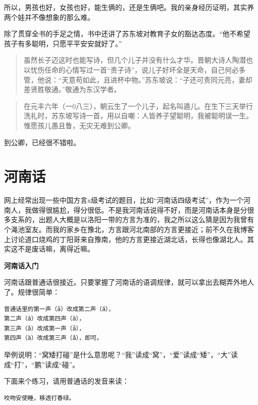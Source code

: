 \documentclass[twoside,openright,headings=optiontohead]{ctexbook} %
\begin{document}
{所以，男孩也好，女孩也好，能生俩的，还是生俩吧。我的亲身经历证明，其实养两个娃并不像想象的那么难。

除了贯穿全书的手足之情，书中还讲了苏东坡对教育子女的豁达态度。``他不希望孩子有多聪明，只愿平平安安就好了。''

\begin{quote}
虽然长子迈这时也能写诗，但几个儿子并没有什么才华。晋朝大诗人陶潜也以忧伤任命的心情写过一首``责子诗''，说儿子好坏全是天命，自己何必多管，他说：``天意苟如此，且进杯中物。''苏东坡说：``子还可责同元亮，妻却差贤胜敬通。''敬通为东汉学者。
\end{quote}

\begin{quote}
在元丰六年（一0八三），朝云生了一个儿子，起名叫遁儿。在生下三天举行洗礼时，苏东坡写诗一首，用以自嘲：人皆养子望聪明，我被聪明误一生。惟愿孩儿愚且鲁，无灾无难到公卿。
\end{quote}

到公卿，已经很不错啦。

\chapter*{河南话}\label{henanese}

网上经常出现一些中国方言x级考试的题目，比如``河南话四级考试''，作为一个河南人，我做得很尴尬，得分很低。不是我河南话说得不好，而是河南话本身是分很多支系的，出题人大概是以洛阳一带的方言为准的，我之所以这么猜是因为我曾有个渑池室友。而我的家乡在豫北，方言跟河北南部的方言更接近；前不久在我博客上讨论道口烧鸡的丁阳哥来自豫南，他的方言更接近湖北话，长得也像湖北人。其实这不是废话嘛，离得近嘛。

\textbf{河南话入门}

河南话跟普通话很接近。只要掌握了河南话的语调规律，就可以拿出去糊弄外地人了。规律很简单：

\begin{verbatim}
普通话里的第一声（ā）改成第二声（á），
第二声（á）改成第四声（à），
第三声（ǎ）改成第一声（ā），
第四声（à）改成第三声（ǎ），即可。
\end{verbatim}

举例说明：``窝矮打碰''是什么意思呢？``我''读成``窝''，``爱''读成``矮''，``大''读成``打''，``鹏''读成``碰''。

下面来个练习，请用普通话的发音来读：

\begin{verbatim}
咬吻安使睡，移透打春绿。
\end{verbatim}

}
\end{document}
